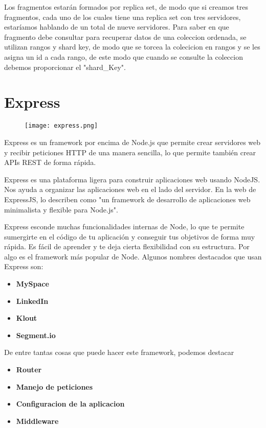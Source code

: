 Los fragmentos estarán formados por replica set, de modo que
si creamos tres fragmentos, cada uno de los cuales tiene una
replica set con tres servidores, estaríamos hablando de un
total de nueve servidores. Para saber en que fragmento debe
consultar para recuperar datos de una coleccion ordenada, se
utilizan rangos y shard key, de modo que se torcea la colecicion en rangos y se les asigna un id a cada rango, de este modo que cuando se consulte la coleccion debemos proporcionar el "shard_Key".




\section{Express}

\begin{figure}[H]
    \centering
    \texttt{[image: express.png]}
\end{figure}

Express es un framework por encima de Node.js que permite crear servidores web y recibir peticiones HTTP de una manera sencilla, lo que permite también crear APIs REST de forma rápida.

Express es una plataforma ligera para construir aplicaciones web usando NodeJS. Nos ayuda a organizar las aplicaciones web en el lado del servidor. En la web de ExpressJS, lo describen como "un framework de desarrollo de aplicaciones web minimalista y flexible para Node.js".

Express esconde muchas funcionalidades internas de Node, lo que te permite sumergirte en el código de tu aplicación y conseguir tus objetivos de forma muy rápida. Es fácil de aprender y te deja cierta flexibilidad con su estructura.
Por algo es el framework más popular de Node. Algunos nombres destacados que usan Express son:

\begin{itemize}

\item \textbf{MySpace}
\item \textbf{LinkedIn}
\item \textbf{Klout}
\item \textbf{Segment.io}
\end{itemize}

De entre tantas cosas que puede hacer este framework, podemos destacar

\begin{itemize}

\item \textbf{Router}
\item \textbf{Manejo de peticiones}
\item \textbf{Configuracion de la aplicacion}
\item \textbf{Middleware}
\end{itemize}

